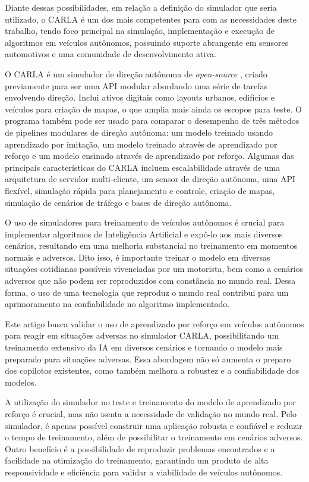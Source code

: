 \documentclass[a4paper,12pt,Times]{article}
\begin{document}
Diante dessas possibilidades, em relação a definição do simulador que seria utilizado, o CARLA é um dos mais competentes para com as necessidades deste trabalho, tendo foco principal na simulação, implementação e execução de algoritmos em veículos autônomos, possuindo suporte abrangente em sensores automotivos e uma comunidade de desenvolvimento ativa.

O CARLA é um simulador de direção autônoma de \textit{open-source} , criado previamente para ser uma API modular abordando uma série de tarefas envolvendo direção. Inclui ativos digitais como layouts urbanos, edifícios e veículos para criação de mapas, o que amplia mais ainda os escopos para teste. O programa também pode ser usado para comparar o desempenho de três métodos de pipelines modulares de direção autônoma: um modelo treinado usando aprendizado por imitação, um modelo treinado através de aprendizado por reforço e um modelo ensinado através de aprendizado por reforço. Algumas das principais características do CARLA incluem escalabilidade através de uma arquitetura de servidor multi-cliente, um sensor de direção autônoma, uma API flexível, simulação rápida para planejamento e controle, criação de mapas, simulação de cenários de tráfego e bases de direção autônoma.


O uso de simuladores para treinamento de veículos autônomos é crucial para implementar algoritmos de Inteligência Artificial e expô-lo aos mais diversos cenários, resultando em uma melhoria substancial no treinamento em momentos normais e adversos. Dito isso, é importante treinar o modelo em diversas situações cotidianas possíveis vivenciadas por um motorista, bem como a cenários adversos que não podem ser reproduzidos com constância no mundo real. Dessa forma, o uso de uma tecnologia que reproduz o mundo real contribui para um aprimoramento na confiabilidade no algoritmo implementado.

Este artigo busca validar o uso de aprendizado por reforço em veículos autônomos para reagir em situações adversas no simulador CARLA, possibilitando um treinamento extensivo da IA em diversos cenários e tornando o modelo mais preparado para situações adversas. Essa abordagem não só aumenta o preparo dos copilotos existentes, como também melhora a robustez e a confiabilidade dos modelos.

A utilização do simulador no teste e treinamento do modelo de aprendizado por reforço é crucial, mas não isenta a necessidade de validação no mundo real. Pelo simulador, é apenas possível construir uma aplicação robusta e confiável e reduzir o tempo de treinamento, além de possibilitar o treinamento em cenários adversos. Outro benefício é a possibilidade de reproduzir problemas encontrados e a facilidade na otimização do treinamento, garantindo um produto de alta responsividade e eficiência para validar a viabilidade de veículos autônomos.
\end{document}

